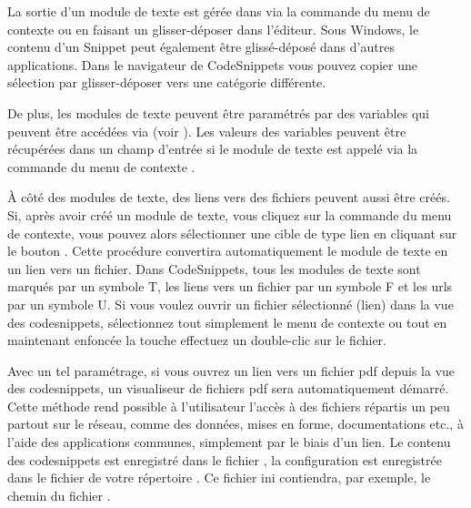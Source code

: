 
La sortie d'un module de texte est gérée dans \codeblocks via la commande  du menu de contexte ou en faisant un glisser-déposer dans l'éditeur. Sous Windows, le contenu d'un Snippet peut également être glissé-déposé dans d'autres applications. Dans le navigateur de CodeSnippets vous pouvez copier une sélection par glisser-déposer vers une catégorie différente.

De plus, les modules de texte peuvent être paramétrés par des variables  qui peuvent être accédées via   (voir ). Les valeurs des variables peuvent être récupérées dans un champ d'entrée si le module de texte est appelé via la commande du menu de contexte .

À côté des modules de texte, des liens vers des fichiers peuvent aussi être créés. Si, après avoir créé un module de texte, vous cliquez sur la commande  du menu de contexte, vous pouvez alors sélectionner une cible de type lien en cliquant sur le bouton . Cette procédure convertira automatiquement le module de texte en un lien vers un fichier. Dans CodeSnippets, tous les modules de texte sont marqués par un symbole T, les liens vers un fichier par un symbole F et les urls par un symbole U. Si vous voulez ouvrir un fichier sélectionné (lien) dans la vue des codesnippets, sélectionnez tout simplement le menu de contexte  ou tout en maintenant enfoncée la touche  effectuez un double-clic sur le fichier.


Avec un tel paramétrage, si vous ouvrez un lien vers un fichier pdf depuis la vue des codesnippets, un visualiseur de fichiers pdf sera automatiquement démarré. Cette méthode rend possible à l'utilisateur l'accès à des fichiers répartis un peu partout sur le réseau, comme des données, mises en forme, documentations etc., à l'aide des applications communes, simplement par le biais d'un lien. Le contenu des codesnippets est enregistré dans le fichier , la configuration est enregistrée dans le fichier  de votre répertoire . Ce fichier ini contiendra, par exemple, le chemin du fichier .


